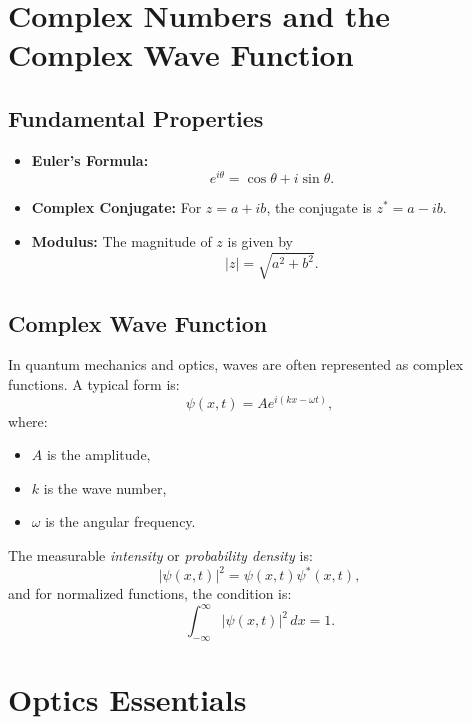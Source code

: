 \documentclass[11pt]{article}
\begin{document}
\section{Complex Numbers and the Complex Wave Function}
\subsection{Fundamental Properties}
\begin{itemize}[leftmargin=*, label={--}]
    \item \textbf{Euler's Formula:}
    \begin{equation}
        e^{i\theta} = \cos\theta + i\sin\theta.
    \end{equation}
    \item \textbf{Complex Conjugate:} For \(z = a + ib\), the conjugate is \(z^* = a - ib\).
    \item \textbf{Modulus:} The magnitude of \(z\) is given by
    \begin{equation}
        |z| = \sqrt{a^2+b^2}.
    \end{equation}
\end{itemize}

\subsection{Complex Wave Function}
In quantum mechanics and optics, waves are often represented as complex functions. A typical form is:
\begin{equation}
    \psi(x,t) = A e^{i(kx - \omega t)},
\end{equation}
where:
\begin{itemize}[leftmargin=*, label={--}]
    \item \(A\) is the amplitude,
    \item \(k\) is the wave number,
    \item \(\omega\) is the angular frequency.
\end{itemize}
The measurable \emph{intensity} or \emph{probability density} is:
\begin{equation}
    |\psi(x,t)|^2 = \psi(x,t)\psi^*(x,t),
\end{equation}
and for normalized functions, the condition is:
\begin{equation}
    \int_{-\infty}^{\infty} |\psi(x,t)|^2\, dx = 1.
\end{equation}

\section{Optics Essentials}
\end{document}
